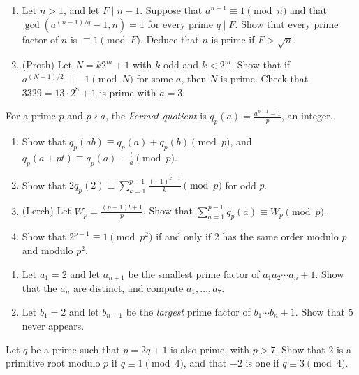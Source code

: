 \begin{exercise}[$\star\star$]\label{pb:pocklington}
\begin{enumerate}[label=(\alph*)]
\item Let $n>1$, and let $F\mid n-1$. Suppose that $a^{n-1}\equiv1\pmod n$ and that $\gcd(a^{(n-1)/q}-1,n)=1$ for every prime
$q\mid F$. Show that every prime factor of $n$ is $\equiv1\pmod F$. Deduce that $n$ is prime if $F>\sqrt n$.
\item (Proth) Let $N=k2^m+1$ with $k$ odd and $k<2^m$. Show that if $a^{(N-1)/2}\equiv-1\pmod N$ for some $a$, then $N$ is
prime. Check that $3329=13\cdot2^8+1$ is prime with $a=3$.
\end{enumerate}
\end{exercise}

\begin{exercise}[$\star\star$]\label{pb:fermatquot}
For a prime $p$ and $p\nmid a$, the \emph{Fermat quotient} is $q_p(a)=\frac{a^{p-1}-1}p$, an integer.
\begin{enumerate}[label=(\alph*)]
\item Show that $q_p(ab)\equiv q_p(a)+q_p(b)\pmod p$, and $q_p(a+pt)\equiv q_p(a)-\frac ta\pmod p$.
\item Show that $2q_p(2)\equiv\sum_{k=1}^{p-1}\frac{(-1)^{k-1}}k\pmod p$ for odd $p$.
\item (Lerch) Let $W_p=\frac{(p-1)!+1}p$. Show that $\sum_{a=1}^{p-1}q_p(a)\equiv W_p\pmod p$.
\item Show that $2^{p-1}\equiv1\pmod{p^2}$ if and only if $2$ has the same order modulo $p$ and modulo $p^2$.
\end{enumerate}
\end{exercise}

\begin{exercise}[$\star\star$]\label{pb:mullin}
\begin{enumerate}[label=(\alph*)]
\item Let $a_1=2$ and let $a_{n+1}$ be the smallest prime factor of $a_1a_2\cdots a_n+1$. Show that the $a_n$ are distinct, and
compute $a_1,\dots,a_7$.
\item Let $b_1=2$ and let $b_{n+1}$ be the \emph{largest} prime factor of $b_1\cdots b_n+1$. Show that $5$ never appears.
\end{enumerate}
\end{exercise}

\begin{exercise}[$\star$]\label{pb:artin}
Let $q$ be a prime such that $p=2q+1$ is also prime, with $p>7$. Show that $2$ is a primitive root modulo $p$ if
$q\equiv1\pmod4$, and that $-2$ is one if $q\equiv3\pmod4$.
\end{exercise}

